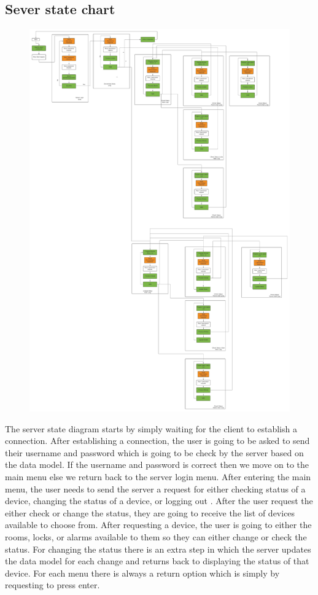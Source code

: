 \documentclass[11pt]{article}
\begin{document}
		\subsection{Sever state chart}
			\begin{figure}[H]
				\centering
				\includegraphics[scale=0.5]{server_state_diagram}
				\label{fig:serverstatediagram}
			\end{figure}
		The server state diagram starts by simply waiting for the client to establish a connection. After establishing a connection, the user is going to be asked to send their username and password which is going to be check by the server based on the data model. If the username and password is correct then we move on to the main menu else we return back to the server login menu. After entering the main menu, the user needs to send the server a request for either checking status of a device, changing the status of a device, or logging out . After the user request the either check or change the status, they are going to receive the list of devices available to choose from. After requesting a device, the user is going to either the rooms, locks, or alarms available to them so they can either change or check the status. For changing the status there is an extra step in which the server updates the data model for each change and returns back to displaying the status of that device. For each menu there is always a return option which is simply by requesting to press enter. 
\end{document}
